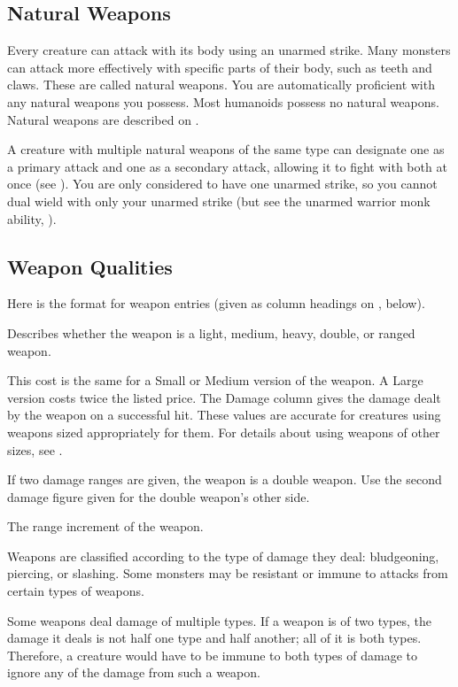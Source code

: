     \subsection{Natural Weapons}\label{Natural Weapons}
        Every creature can attack with its body using an unarmed strike. Many monsters can attack more effectively with specific parts of their body, such as teeth and claws. These are called natural weapons. You are automatically proficient with any natural weapons you possess. Most humanoids possess no natural weapons. Natural weapons are described on .

        A creature with multiple natural weapons of the same type can designate one as a primary attack and one as a secondary attack, allowing it to fight with both at once (see ). You are only considered to have one unarmed strike, so you cannot dual wield with only your unarmed strike (but see the unarmed warrior monk ability, ).

    \subsection{Weapon Qualities}
        Here is the format for weapon entries (given as column headings on , below).

         Describes whether the weapon is a light, medium, heavy, double, or ranged weapon.

        \par This cost is the same for a Small or Medium version of the weapon. A Large version costs twice the listed price.
         The Damage column gives the damage dealt by the weapon on a successful hit.
        These values are accurate for creatures using weapons sized appropriately for them.
        For details about using weapons of other sizes, see .

        If two damage ranges are given, the weapon is a double weapon. Use the second damage figure given for the double weapon's other side.

         The range increment of the weapon.

         Weapons are classified according to the type of damage they deal: bludgeoning, piercing, or slashing. Some monsters may be resistant or immune to attacks from certain types of weapons.

        Some weapons deal damage of multiple types. If a weapon is of two types, the damage it deals is not half one type and half another; all of it is both types. Therefore, a creature would have to be immune to both types of damage to ignore any of the damage from such a weapon.

